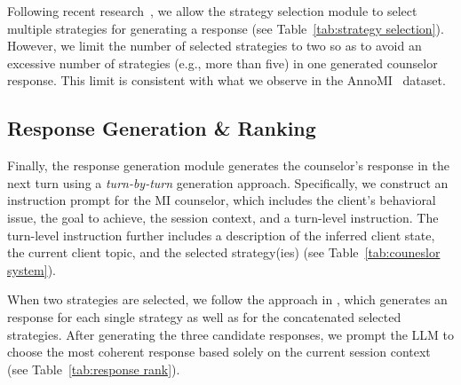 Following recent research~\citep{sun2024chain,xie2024few}, we allow the strategy selection module to select multiple strategies for generating a response (see Table~\ref{tab:strategy selection}). However, we limit the number of selected strategies to two so as to avoid an excessive number of strategies (e.g., more than five) in one generated counselor response. This limit is consistent with what we observe in the AnnoMI~\citep{wu2022anno,wu2023creation} dataset. 

\subsection{Response Generation \& Ranking}
\label{sec: resopnse generation}

Finally, the response generation module generates the counselor's response in the next turn using a {\em turn-by-turn} generation approach. 
Specifically, we construct an instruction prompt for the MI counselor, which includes the client's behavioral issue, the goal to achieve, the session context, and a turn-level instruction. The turn-level instruction further includes a description of the inferred client state, the current client topic, and the selected strategy(ies) (see Table~\ref{tab:couneslor system}).

When two strategies are selected, we follow the approach in \citet{hsu2023helping}, which generates an response for each single strategy as well as for the concatenated selected strategies. After generating the three candidate responses, we prompt the LLM to choose the most coherent  response based solely on the current session context (see Table~\ref{tab:response rank}).

